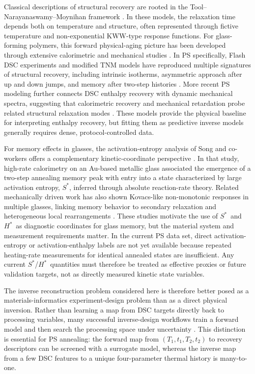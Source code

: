 \documentclass[11pt]{article}
\newcommand{\Tone}{\ensuremath{T_{1}}}
\newcommand{\ToneTime}{\ensuremath{t_{1}}}
\newcommand{\Ttwo}{\ensuremath{T_{2}}}
\newcommand{\TtwoTime}{\ensuremath{t_{2}}}
\newcommand{\Sstar}{\ensuremath{S^{\ast}}}
\newcommand{\Hstar}{\ensuremath{H^{\ast}}}
\begin{document}
Classical descriptions of structural recovery are rooted in the Tool--Narayanaswamy--Moynihan framework \citep{tool1946relation,narayanaswamy1971model,moynihan1976structural}. In these models, the relaxation time depends both on temperature and structure, often represented through fictive temperature and non-exponential KWW-type response functions. For glass-forming polymers, this forward physical-aging picture has been developed through extensive calorimetric and mechanical studies \citep{mckenna2017perspective}. In PS specifically, Flash DSC experiments and modified TNM models have reproduced multiple signatures of structural recovery, including intrinsic isotherms, asymmetric approach after up and down jumps, and memory after two-step histories \citep{grassia2018complete}. More recent PS modeling further connects DSC enthalpy recovery with dynamic mechanical spectra, suggesting that calorimetric recovery and mechanical retardation probe related structural relaxation modes \citep{nitta2023phenomenological}. These models provide the physical baseline for interpreting enthalpy recovery, but fitting them as predictive inverse models generally requires dense, protocol-controlled data.

For memory effects in glasses, the activation-entropy analysis of Song and co-workers offers a complementary kinetic-coordinate perspective \citep{song2020activation}. In that study, high-rate calorimetry on an Au-based metallic glass associated the emergence of a two-step annealing memory peak with entry into a state characterized by large activation entropy, \Sstar, inferred through absolute reaction-rate theory. Related mechanically driven work has also shown Kovacs-like non-monotonic responses in multiple glasses, linking memory behavior to secondary relaxation and heterogeneous local rearrangements \citep{tong2023strain}. These studies motivate the use of \Sstar\ and \Hstar\ as diagnostic coordinates for glass memory, but the material system and measurement requirements matter. In the current PS data set, direct activation-entropy or activation-enthalpy labels are not yet available because repeated heating-rate measurements for identical annealed states are insufficient. Any current \Sstar/\Hstar\ quantities must therefore be treated as effective proxies or future validation targets, not as directly measured kinetic state variables.

The inverse reconstruction problem considered here is therefore better posed as a materials-informatics experiment-design problem than as a direct physical inversion. Rather than learning a map from DSC targets directly back to processing variables, many successful inverse-design workflows train a forward model and then search the processing space under uncertainty \citep{frazier2016bayesian,wu2024efficient}. This distinction is essential for PS annealing: the forward map from $(\Tone,\ToneTime,\Ttwo,\TtwoTime)$ to recovery descriptors can be screened with a surrogate model, whereas the inverse map from a few DSC features to a unique four-parameter thermal history is many-to-one.
\end{document}
